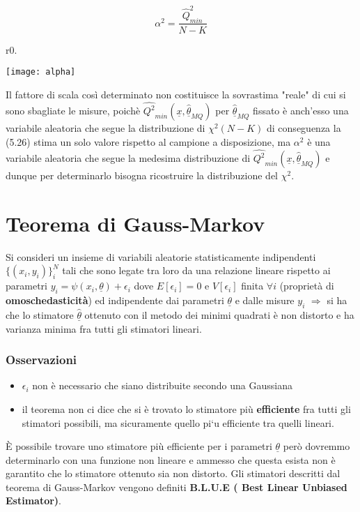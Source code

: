 \begin{equation}
	\alpha^2 = \dfrac{\hat{Q}_{min}^{2}}{N-K}
\end{equation}

\begin{wrapfigure}{r}{0.\textwidth}
\centering

\texttt{[image: alpha]}	

\end{wrapfigure}

\noindent Il fattore di scala cos\`{i} determinato non costituisce la sovrastima "reale" di cui si sono sbagliate le misure, poich\`{e} $\hat{Q^2}_{min}(\underline{x},\underline{\hat{\theta}}_{MQ})$ per $\underline{\hat{\theta}}_{MQ}$ fissato \`{e} anch'esso una variabile aleatoria  che segue la distribuzione di $\chi^2(N-K)$ di conseguenza la (5.26) stima un solo valore rispetto al campione a disposizione, ma $\alpha^2$ \`{e} una variabile aleatoria che segue la medesima distribuzione di $\hat{Q^2}_{min}(\underline{x},\underline{\hat{\theta}}_{MQ})$ e dunque per determinarlo bisogna ricostruire la distribuzione del $\chi^2$.

\section{Teorema di Gauss-Markov}
Si consideri un insieme di variabili aleatorie statisticamente indipendenti $\{(x_i,y_i)\}_i^N$ tali che sono legate tra loro da una relazione lineare rispetto ai parametri $y_i = \psi(x_i ,\underline{\theta}) + \epsilon_i$ dove $E[\epsilon_i] = 0$ e $V[\epsilon_i] $ finita $\forall i$ (propriet\`{a} di \textbf{omoschedasticit\`{a}}) ed indipendente dai parametri $\underline{\theta}$ e dalle misure $y_i$ $\Rightarrow$ si ha che lo stimatore $\underline{\hat{\theta}}$ ottenuto con il metodo dei minimi quadrati \`{e} non distorto e ha varianza minima fra tutti gli stimatori lineari.

\subsubsection{Osservazioni}

\begin{itemize}
	\item $\epsilon_{i}$ non \`{e} necessario che siano distribuite secondo una Gaussiana
	\item il teorema non ci dice che si \`{e} trovato lo stimatore pi\`{u} \textbf{efficiente} fra tutti gli stimatori possibili, ma sicuramente quello pi`{u} efficiente tra quelli lineari.
\end{itemize}  
\`{E} possibile trovare uno stimatore pi\`{u} efficiente per i parametri $\underline{\theta}$ per\`{o} dovremmo determinarlo con una funzione non lineare e ammesso che questa esista non \`{e} garantito che lo stimatore ottenuto sia non distorto.\newline
Gli stimatori descritti dal teorema di Gauss-Markov vengono definiti \textbf{B.L.U.E ( Best Linear Unbiased Estimator)}. 

